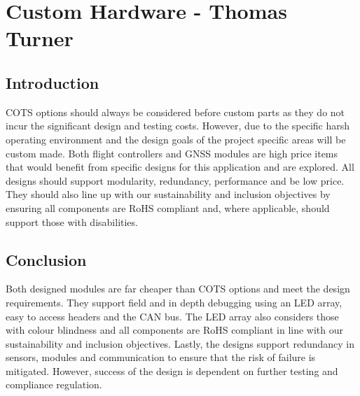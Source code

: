 \newpage
{}
\section{Custom Hardware - Thomas Turner} \label{section:Custom Hardware}
\subsection{Introduction}\label{sub_section:tgt_custom_hardware_intro}
\gls{COTS} options should always be considered before custom parts as they do not incur the significant design and testing costs. However, due to the specific harsh operating environment and the design goals of the project specific areas will be custom made. Both flight controllers and \gls{GNSS} modules are high price items that would benefit from specific designs for this application and are explored. All designs should support modularity, redundancy, performance and be low price. They should also line up with our sustainability and inclusion objectives by ensuring all components are \gls{RoHS} compliant and, where applicable, should support those with disabilities.





\subsection{Conclusion}
Both designed modules are far cheaper than \gls{COTS} options and meet the design requirements. They support field and in depth debugging using an \gls{LED} array, easy to access headers and the \gls{CAN} bus. The LED array also considers those with colour blindness and all components are \gls{RoHS} compliant in line with our sustainability and inclusion objectives. Lastly, the designs support redundancy in sensors, modules and communication to ensure that the risk of failure is mitigated. However, success of the design is dependent on further testing and compliance regulation.